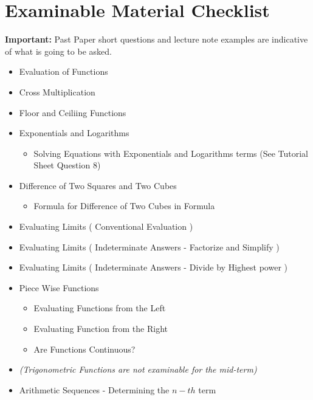 \documentclass[]{article}
\begin{document}



\Large
\section*{Examinable Material Checklist}

\textbf{Important:} Past Paper short questions and lecture note examples are indicative of what is going to be asked.

\begin{itemize}
	\item Evaluation of Functions
	\item Cross Multiplication
	\item Floor and Ceiliing Functions
	\item Exponentials and Logarithms
	\begin{itemize}
		\item Solving Equations with Exponentials and Logarithms terms (See Tutorial Sheet Question 8)
	\end{itemize}
	\item Difference of Two Squares and Two Cubes
	\begin{itemize}
		\item Formula for Difference of Two Cubes in Formula
	\end{itemize}
	\item Evaluating Limits ( Conventional Evaluation )
	\item Evaluating Limits ( Indeterminate Answers - Factorize and Simplify )
	\item Evaluating Limits ( Indeterminate Answers - Divide by Highest power )
	\item Piece Wise Functions
	\begin{itemize}
		\item Evaluating Functions from the Left 
		\item Evaluating Function from the Right
		\item Are Functions Continuous?
	\end{itemize}
	\item \textit{(Trigonometric Functions are not examinable for the mid-term)}
	\item Arithmetic Sequences - Determining the $n-th$ term

\end{itemize}
\end{document}
